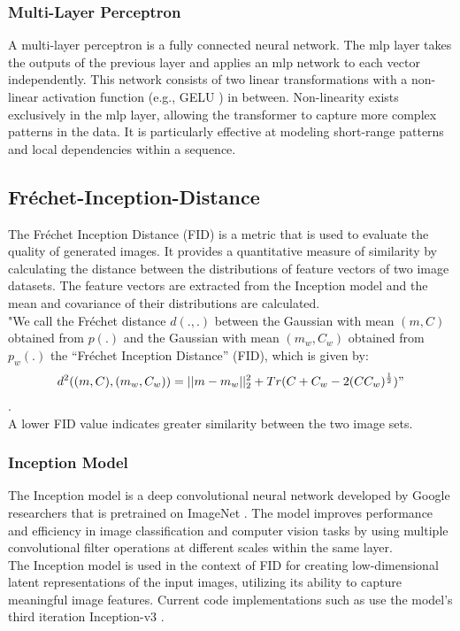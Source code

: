 \subsubsection*{Multi-Layer Perceptron}
A multi-layer perceptron is a fully connected neural network. The mlp layer takes the outputs of the previous layer and applies an mlp network to each vector independently. This network consists of two linear transformations with a non-linear activation function (e.g., GELU \cite{hendrycks2016gaussian}) in between. Non-linearity exists exclusively in the mlp layer, allowing the transformer to capture more complex patterns in the data. It is particularly effective at modeling short-range patterns and local dependencies within a sequence.



\subsection{Fréchet-Inception-Distance}
The Fréchet Inception Distance (FID) is a metric that is used to evaluate the quality of generated images. It provides a quantitative measure of similarity by calculating the distance between the distributions of feature vectors of two image datasets. The feature vectors are extracted from the Inception model and the mean and covariance of their distributions are calculated.\\
"We call the Fréchet distance \(d(., .)\)
between the Gaussian with mean \((m, C)\) obtained from \(p(.)\) and the Gaussian with mean \((m_w, C_w)\)
obtained from \(p_w(.)\) the “Fréchet Inception Distance” (FID), which is given by:
\begin{align*}
    d^2((m,C),(m_w,C_w)) = || m - m_w ||_2^2 + Tr(C+C_w-2(CC_w)^\frac{1}{2})" 
\end{align*}
\cite{heusel2017gans}.\\
A lower FID value indicates greater similarity between the two image sets.



\subsubsection{Inception Model}
The Inception model \cite{Szegedy_2015_CVPR} is a deep convolutional neural network developed by Google researchers that is pretrained on ImageNet \cite{deng2009imagenet}. The model improves performance and efficiency in image classification and computer vision tasks by using multiple convolutional filter operations at different scales within the same layer.\\
The Inception model is used in the context of FID for creating low-dimensional latent representations of the input images, utilizing its ability to capture meaningful image features.
Current code implementations such as \cite{Seitzer2020FID} use the model's third iteration Inception-v3 \cite{szegedy2016rethinking}.



